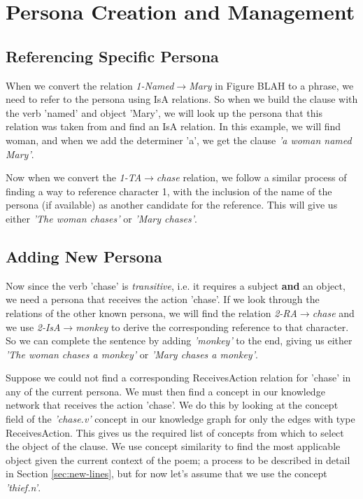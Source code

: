 
\section{Persona Creation and Management}
\label{sec:persona}
\subsection{Referencing Specific Persona}
When we convert the relation \textit{1-Named$\rightarrow$Mary} in Figure BLAH to a phrase, we need to refer to the persona using IsA relations. So when we build the clause with the verb 'named' and object 'Mary', we will look up the persona that this relation was taken from and find an IsA relation. In this example, we will find woman, and when we add the determiner 'a', we get the clause \textit{'a woman named Mary'}.

Now when we convert the \textit{1-TA$\rightarrow$chase} relation, we follow a similar process of finding a way to reference character 1, with the inclusion of the name of the persona (if available) as another candidate for the reference. This will give us either \textit{'The woman chases'} or \textit{'Mary chases'}.

\subsection{Adding New Persona}
Now since the verb 'chase' is \textit{transitive}, i.e. it requires a subject \textbf{and} an object, we need a persona that receives the action 'chase'. If we look through the relations of the other known persona, we will find the relation \textit{2-RA$\rightarrow$chase} and we use \textit{2-IsA$\rightarrow$monkey} to derive the corresponding reference to that character. So we can complete the sentence by adding \textit{'monkey'} to the end, giving us either \textit{'The woman chases a monkey'} or \textit{'Mary chases a monkey'}.

Suppose we could not find a corresponding ReceivesAction relation for 'chase' in any of the current persona. We must then find a concept in our knowledge network that receives the action 'chase'. We do this by looking at the concept field of the \textit{'chase.v'} concept in our knowledge graph for only the edges with type ReceivesAction. This gives us the required list of concepts from which to select the object of the clause. We use concept similarity to find the most applicable object given the current context of the poem; a process to be described in detail in Section \ref{sec:new-lines}, but for now let's assume that we use the concept \textit{'thief.n'}.

